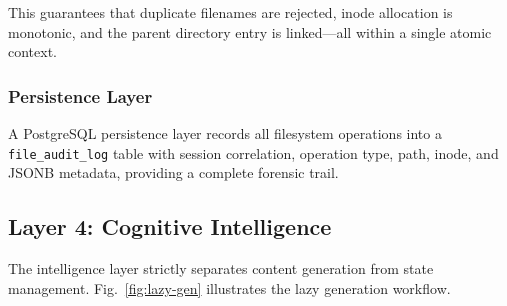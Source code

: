 \documentclass[conference]{IEEEtran}
\begin{document}
This guarantees that duplicate filenames are rejected, inode allocation is monotonic, and the parent directory entry is linked---all within a single atomic context.

\subsubsection{Persistence Layer}

A PostgreSQL persistence layer records all filesystem operations into a \texttt{file\_audit\_log} table with session correlation, operation type, path, inode, and JSONB metadata, providing a complete forensic trail.

\subsection{Layer 4: Cognitive Intelligence}

The intelligence layer strictly separates content generation from state management.
Fig.~\ref{fig:lazy-gen} illustrates the lazy generation workflow.
\end{document}
